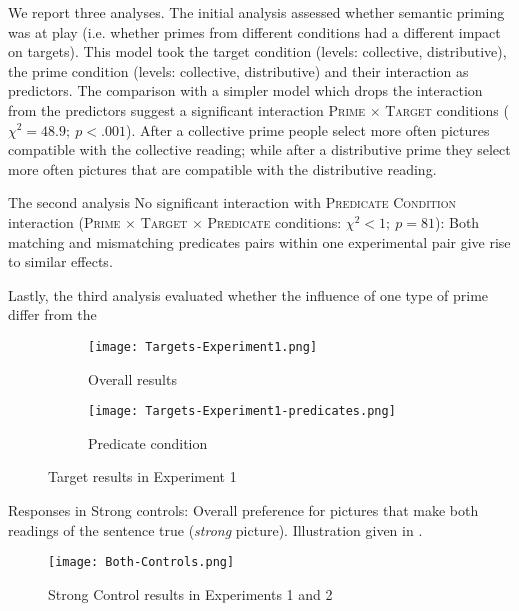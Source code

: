\documentclass[a4paper, 11pt]{article}
\begin{document}
We report three analyses. The initial analysis assessed whether semantic priming was at play (i.e. whether primes from different conditions had a different impact on targets). This model took the target condition (levels: collective, distributive), the prime condition (levels: collective, distributive) and their interaction as predictors. 
The comparison with a simpler model which drops the interaction from the predictors suggest a significant interaction \textsc{Prime} $\times$ \textsc{Target} conditions ($\chi^{2}=48.9; \ p<.001$). 
After a collective prime people select more often pictures compatible with the collective reading; while after a distributive prime they select more often pictures that are compatible with the distributive reading. 

The second analysis 
No significant interaction with \textsc{Predicate Condition} interaction (\textsc{Prime} $\times$ \textsc{Target} $\times$ \textsc{Predicate} conditions: $\chi^{2}<1; \ p=81$): Both matching and mismatching predicates pairs within one experimental pair give rise to similar effects. 

Lastly, the third analysis evaluated whether the influence of one type of prime differ from the   


\begin{figure}[h!]
  \centering
  \begin{subfigure}[b]{0.45\textwidth}
    \texttt{[image: Targets-Experiment1.png]}
         \caption{Overall results}
        \label{fig:targetresults.general}
     \end{subfigure}
          \begin{subfigure}[b]{0.5\textwidth}
    \texttt{[image: Targets-Experiment1-predicates.png]}
             \caption{Predicate condition}
        \label{fig:targetresults.predicate}
      \end{subfigure}
      \caption{Target results in Experiment 1}
      \label{fig.targetresults.exp1}
\end{figure}




Responses in Strong controls: Overall preference for pictures that make both readings of the sentence true (\emph{strong} picture). Illustration given in .

\begin{figure}[h!]
  \centering
      \texttt{[image: Both-Controls.png]}
         \caption{Strong Control results in Experiments 1 and 2}
        \label{fig:controls}
  \end{figure}
\end{document}
